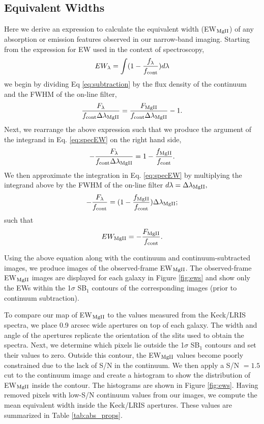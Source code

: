 \documentclass[twocolumn]{aastex61}
\begin{document}
\subsection{Equivalent Widths}\label{subsec.ew}
Here we derive an expression to calculate the equivalent width (EW$_{\rm{MgII}}$) of any absorption or emission features observed in our narrow-band imaging. Starting from the expression for EW used in the context of spectroscopy,
\begin{equation}
EW_{\lambda}=\int (1-\frac{f_{\lambda}}{f_{\rm{cont}}})d\lambda
\label{eq:specEW}
\end{equation}
we begin by dividing Eq \ref{eq:subtraction} by the flux density of the continuum and the FWHM of the on-line filter,
\begin{equation}
\frac{F_{\lambda}}{f_{\rm{cont}}\Delta \lambda_{\rm{MgII}}}=\frac{F_{\rm{MgII}}}{f_{\rm{cont}}\Delta \lambda_{\rm{MgII}}}- 1.
\end{equation}
Next, we rearrange the above expression such that we produce the argument of the integrand in Eq. \ref{eq:specEW} on the right hand side,
\begin{equation}
-\frac{F_{\lambda}}{f_{\rm{cont}}\Delta \lambda_{\rm{MgII}}}=1-\frac{f_{\rm{MgII}}}{f_{\rm{cont}}}.
\end{equation}
We then approximate the integration in Eq. \ref{eq:specEW} by multiplying the integrand above by the FWHM of the on-line filter $d\lambda=\Delta \lambda_{\rm{MgII}},$
\begin{equation}
-\frac{F_{\lambda}}{f_{\rm{cont}}}=(1-\frac{f_{\rm{MgII}}}{f_{\rm{cont}}})\Delta \lambda_{\rm{MgII}};
\end{equation}
such that
\begin{equation}
EW_{\rm{MgII}}=-\frac{F_{\rm{MgII}}}{f_{\rm{cont}}}.
\end{equation}

Using the above equation along with the continuum and continuum-subtracted images, we produce images of the observed-frame EW$_{\rm{MgII}}$. The observed-frame EW$_{\rm{MgII}}$ images are displayed for each galaxy in Figure \ref{fig:ews} and show only the EWs within the 1$\sigma$ SB$_1$ contours of the corresponding  images (prior to continuum subtraction). 

To compare our map of EW$_{\rm{MgII}}$ to the values measured from the Keck/LRIS spectra, we place 0.9 arcsec wide apertures on top of each galaxy. The width and angle of the apertures replicate the orientation of the slits used to obtain the spectra. Next, we determine which pixels lie outside the 1$\sigma$ SB$_1$ contours and set their values to zero. Outside this contour, the EW$_{\rm{MgII}}$ values become poorly constrained due to the lack of S/N in the continuum. We then apply a S/N $= 1.5$ cut to the continuum image and create a histogram to show the distribution of EW$_{\rm{MgII}}$ inside the contour. The histograms are shown in Figure \ref{fig:ews}. Having removed pixels with low-S/N continuum values from our images, we compute the mean equivalent width inside the Keck/LRIS apertures. These values are summarized in Table \ref{tab:abs_props}.
 
\end{document}
